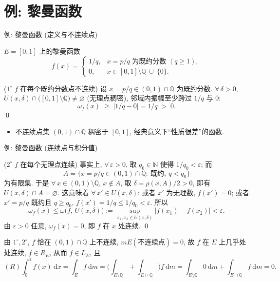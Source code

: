 
\section[黎曼函数]{例: 黎曼函数}


\begin{frame}{例: 黎曼函数 (定义与不连续点)}

\begin{eg}
$E = [0, 1]$ 上的黎曼函数
\[
f(x) =
\begin{cases}
1/q , & x = p/q \text{ 为既约分数 } (q \geqslant 1), \\
0 , & x \in [0,1] \setminus \mathbb{Q} \ \cup\ \{0\} .
\end{cases}
\]
\end{eg}

\startproof[bg=yellow, fg=red]($1^\circ$ $f$ 在每个既约分数点不连续)
设 $x = p/q \in (0,1) \cap \mathbb{Q}$ 为既约分数. $\forall\, \delta > 0$,
$U(x, \delta) \cap \big( [0,1] \setminus \mathbb{Q} \big) \neq \varnothing$
(无理点稠密), 邻域内振幅至少跨过 $1/q$ 与 $0$:
\[
\omega_f(x) \;\geqslant\; |1/q - 0| = 1/q \;>\; 0 .
\]
\qed

\pause

\begin{itemize}
\item 不连续点集 $(0,1) \cap \mathbb{Q}$ \alert{稠密}于 $[0,1]$,
  经典意义下``性质很差''的函数.
\end{itemize}

\end{frame}


\begin{frame}{例: 黎曼函数 (连续点与积分值)}

\startproof[bg=yellow, fg=red]($2^\circ$ $f$ 在每个无理点连续)
事实上, $\forall\, \varepsilon > 0$, 取 $q_0 \in \mathbb{N}$ 使得 $1/q_0 < \varepsilon$;
而
\[
A = \big\{ x = p/q \in (0,1) \cap \mathbb{Q}:\ \text{既约},\ q < q_0 \big\}
\]
为\alert{有限集}. 于是 $\forall\, x \in (0,1) \setminus \mathbb{Q}$, $x \notin A$,
取 $\delta = \rho(x, A)/2 > 0$, 即有 $U(x, \delta) \cap A = \varnothing$.
这意味着 $\forall\, x' \in U(x, \delta)$: 或者 $x'$ 为无理数, $f(x') = 0$;
或者 $x' = p/q$ 既约且 $q \geqslant q_0$, $f(x') = 1/q \leqslant 1/q_0 < \varepsilon$. 所以
\[
\omega_f(x) \leqslant \omega\big( f,\, U(x, \delta) \big)
:= \sup_{x_1, x_2 \in U(x, \delta)} |f(x_1) - f(x_2)| < \varepsilon .
\]
由 $\varepsilon > 0$ 任意, $\omega_f(x) = 0$, 即 $f$ 在 $x$ 处连续. \qed

\pause

由 $1^\circ, 2^\circ$, $f$ 恰在 $(0,1) \cap \mathbb{Q}$ 上不连续, $mE(\text{不连续点}) = 0$,
故 $f$ 在 $E$ 上几乎处处连续, $f \in R_E$, 从而 $f \in L_E$, 且
\[
(R) \int_0^1 f(x) ~ \mathrm{d} x
= \int_E f ~ \mathrm{d} m
= \Big( \int_{E \setminus \mathbb{Q}} + \int_{E \cap \mathbb{Q}} \Big) f ~ \mathrm{d} m
= \int_{E \setminus \mathbb{Q}} 0 ~ \mathrm{d} m + \int_{E \cap \mathbb{Q}} f ~ \mathrm{d} m
= 0 .
\]

\end{frame}

